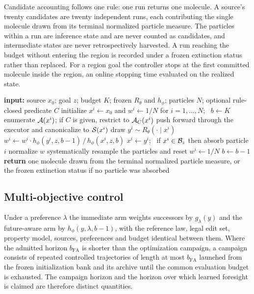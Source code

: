 Candidate accounting follows one rule: one run returns one molecule. A source's twenty candidates are twenty independent runs, each contributing the single molecule drawn from its terminal normalized particle measure. The particles within a run are inference state and are never counted as candidates, and intermediate states are never retrospectively harvested. A run reaching the budget without entering the region is recorded under a frozen extinction status rather than replaced. For a region goal the controller stops at the first committed molecule inside the region, an online stopping time evaluated on the realized state.

\begin{algorithm}[h]
\caption{Controlled molecular sampling, sequential realization}
\begin{algorithmic}[1]
\STATE \textbf{input:} source $x_0$; goal $z$; budget $K$; frozen $R_\theta$ and $h_\phi$; particles $N$; optional rule-closed predicate $C$
\STATE initialize $x^i \leftarrow x_0$ and $w^i \leftarrow 1/N$ for $i=1,\dots,N$; \ $b \leftarrow K$
    \STATE enumerate $\mathcal{A}(x^i)$; if $C$ is given, restrict to $\mathcal{A}_C(x^i)$
    \STATE push forward through the executor and canonicalize to $\mathcal{S}(x^i)$
    \STATE draw $y^i \sim R_\theta(\cdot \mid x^i)$ \hfill {}
    \STATE $w^i \leftarrow w^i \cdot h_\phi(y^i,z,b-1) \,/\, h_\phi(x^i,z,b)$ \hfill {}
    \STATE $x^i \leftarrow y^i$; \ if $x^i \in \mathcal{B}_z$ then absorb particle $i$
  \ENDFOR
  \STATE normalize $w$
    \STATE systematically resample the particles and reset $w^i \leftarrow 1/N$
  \ENDIF
  \STATE $b \leftarrow b-1$
\ENDWHILE
\STATE \textbf{return} one molecule drawn from the terminal normalized particle measure, or the frozen extinction status if no particle was absorbed
\end{algorithmic}
\end{algorithm}

\subsection{Multi-objective control}

Under a preference $\lambda$ the immediate arm weights successors by $g_\lambda(y)$ and the future-aware arm by $h_\phi(y,\lambda,b-1)$, with the reference law, legal edit set, property model, sources, preferences and budget identical between them. Where the admitted horizon $b_{\mathrm{FA}}$ is shorter than the optimization campaign, a campaign consists of repeated controlled trajectories of length at most $b_{\mathrm{FA}}$ launched from the frozen initialization bank and its archive until the common evaluation budget is exhausted. The campaign horizon and the horizon over which learned foresight is claimed are therefore distinct quantities.

